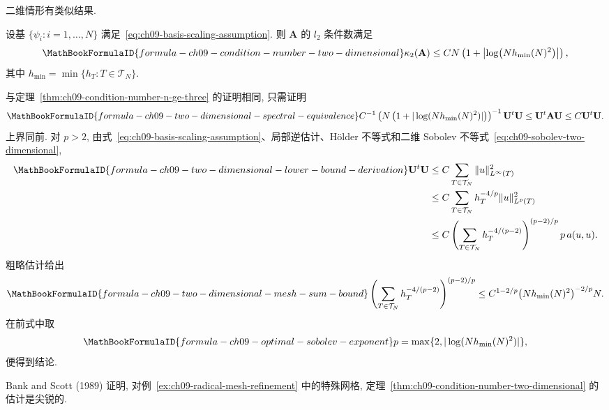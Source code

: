 二维情形有类似结果.

\begin{Theorem}
\label{thm:ch09-condition-number-two-dimensional}
设基 $\{\psi_i:i=1,\ldots,N\}$ 满足~\eqref{eq:ch09-basis-scaling-assumption}. 则 $\mathbf A$ 的 $l_2$ 条件数满足
\[
\MathBookFormulaID{formula-ch09-condition-number-two-dimensional}
\kappa_2(\mathbf A)
\leq CN\left(1+\left|\log\bigl(Nh_{\min}(N)^2\bigr)\right|\right),
\]
其中 $h_{\min}=\min\{h_T:T\in\mathcal T_N\}$.
\end{Theorem}

\begin{Proof}
与定理~\ref{thm:ch09-condition-number-n-ge-three} 的证明相同, 只需证明
\[
\MathBookFormulaID{formula-ch09-two-dimensional-spectral-equivalence}
C^{-1}\left(N\left(1+|\log(Nh_{\min}(N)^2)|\right)\right)^{-1}
\mathbf U^t\mathbf U
\leq\mathbf U^t\mathbf A\mathbf U
\leq C\mathbf U^t\mathbf U.
\]
上界同前. 对 $p>2$, 由式~\eqref{eq:ch09-basis-scaling-assumption}、局部逆估计、Hölder 不等式和二维 Sobolev 不等式~\eqref{eq:ch09-sobolev-two-dimensional},
\begin{align*}
\MathBookFormulaID{formula-ch09-two-dimensional-lower-bound-derivation}
\mathbf U^t\mathbf U
&\leq C\sum_{T\in\mathcal T_N}\|u\|_{L^\infty(T)}^2\\
&\leq C\sum_{T\in\mathcal T_N}h_T^{-4/p}\|u\|_{L^p(T)}^2\\
&\leq C\left(\sum_{T\in\mathcal T_N}h_T^{-4/(p-2)}\right)^{(p-2)/p}
p\,a(u,u).
\end{align*}
粗略估计给出
\[
\MathBookFormulaID{formula-ch09-two-dimensional-mesh-sum-bound}
\left(\sum_{T\in\mathcal T_N}h_T^{-4/(p-2)}\right)^{(p-2)/p}
\leq C^{1-2/p}\bigl(Nh_{\min}(N)^2\bigr)^{-2/p}N.
\]
在前式中取
\[
\MathBookFormulaID{formula-ch09-optimal-sobolev-exponent}
p=\max\{2,|\log(Nh_{\min}(N)^2)|\},
\]
便得到结论.
\end{Proof}

\begin{Remark}
\label{rem:ch09-condition-number-sharpness}
Bank and Scott (1989) 证明, 对例~\ref{ex:ch09-radical-mesh-refinement} 中的特殊网格, 定理~\ref{thm:ch09-condition-number-two-dimensional} 的估计是尖锐的.
\end{Remark}
